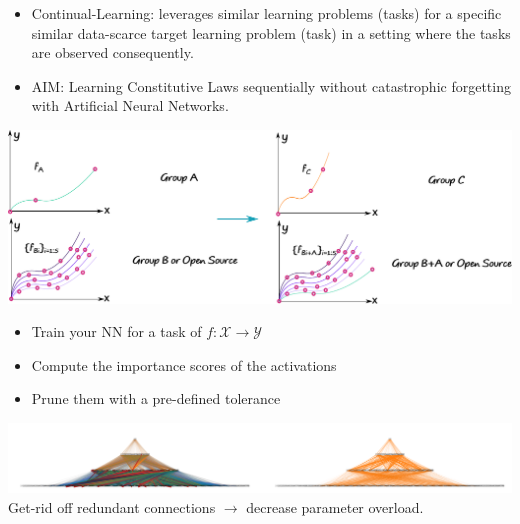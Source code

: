\documentclass[a0paper,portrait]{baposter}
\begin{document}
\begin{poster}
{
  \begin{itemize}
    \color{Pink} \item \color{Black} Continual-Learning: leverages similar learning problems (tasks) for a specific similar data-scarce target learning problem (task) in a setting where the tasks are observed consequently.
  \color{Pink} \item AIM: Learning Constitutive Laws sequentially without catastrophic forgetting with Artificial Neural Networks.
  \end{itemize}
  \includegraphics[width=\textwidth]{figures/aim.pdf}
}

{
  \begin{itemize}
    \item Train your NN for a task of $f:\mathcal{X}\to\mathcal{Y}$
    \item Compute the importance scores of the activations
    \item Prune them with a pre-defined tolerance
  \end{itemize}
  \includegraphics[width=\textwidth]{figures/nnrelief.png}
  \color{Pink} Get-rid off redundant connections $\to$ decrease parameter overload. 
}


\end{poster}
\end{document}
